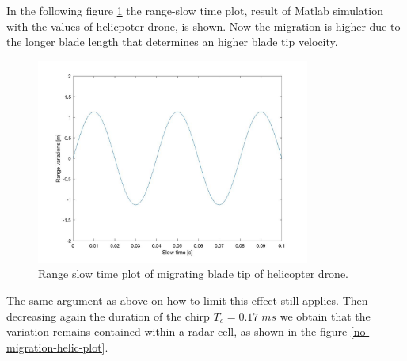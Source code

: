 In the following figure \ref{migrating-helic-drone} the range-slow time plot, result of Matlab simulation with the values of helicpoter drone, is shown. Now the migration is higher due to the longer blade length that determines an higher blade tip velocity.
\begin{figure}[h!]
    \centering
    \includegraphics[width=9cm]{Time-frequency analysis-chap3/img/heloc_range_variations_plot.jpg}
    \caption{Range slow time plot of migrating blade tip of helicopter drone.}
    \label{migrating-helic-drone}
\end{figure}
The same argument as above on how to limit this effect still applies. Then decreasing again the duration of the chirp $T_c = 0.17\;ms$ we obtain that the variation remains contained within a radar cell, as shown in the figure \ref{no-migration-helic-plot}.


